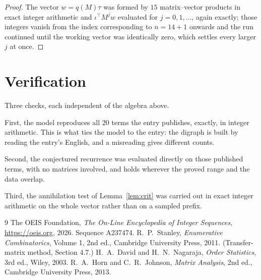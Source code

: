 \documentclass[11pt,a4paper]{article}
\theoremstyle{plain}
\theoremstyle{definition}
\begin{document}
\begin{proof}
The vector $w=q(M)\tau$ was formed by $15$ matrix--vector products in exact integer
arithmetic and $\iota^{\!\top}M^{j}w$ evaluated for $j=0,1,\dots$, again exactly; those
integers vanish from the index corresponding to $n=14+1$ onwards and the run continued
until the working vector was identically zero, which settles every larger $j$ at once.
\end{proof}

\section{Verification}

Three checks, each independent of the algebra above.

First, the model reproduces all $20$ terms the entry publishes, exactly, in integer
arithmetic. This is what ties the model to the entry: the digraph is built by reading the
entry's English, and a misreading gives different counts.

Second, the conjectured recurrence was evaluated directly on those published terms, with no
matrices involved, and holds wherever the proved range and the data overlap.

Third, the annihilation test of Lemma~\ref{lem:crit} was carried out in exact integer
arithmetic on the whole vector rather than on a sampled prefix.

\begin{thebibliography}{9}
 The OEIS Foundation, \emph{The On-Line Encyclopedia of Integer
Sequences}, \url{https://oeis.org}, 2026. Sequence A237474.
 R.~P.~Stanley, \emph{Enumerative Combinatorics}, Volume 1, 2nd ed.,
Cambridge University Press, 2011. (Transfer-matrix method, Section 4.7.)
 H.~A.~David and H.~N.~Nagaraja, \emph{Order Statistics}, 3rd ed., Wiley,
2003.
 R.~A.~Horn and C.~R.~Johnson, \emph{Matrix Analysis}, 2nd ed., Cambridge
University Press, 2013.
\end{thebibliography}
\end{document}
